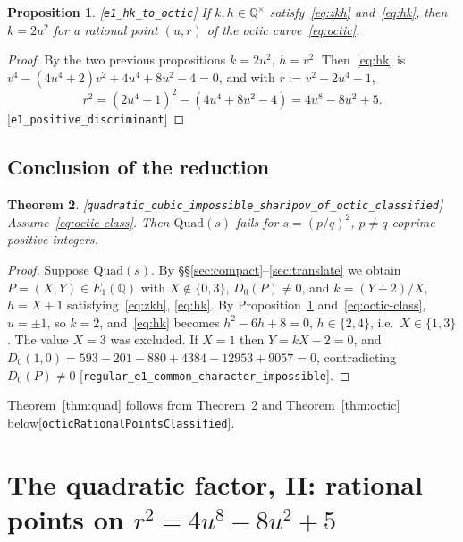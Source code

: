 \documentclass[10pt]{article}
\newtheorem{theorem}{Theorem}[section]
\newtheorem{proposition}[theorem]{Proposition}
\theoremstyle{definition}
\theoremstyle{remark}
\newcommand{\Q}{\mathbb{Q}}
\newcommand{\leanref}[1]{{\scriptsize\textup{[\texttt{#1}]}}\allowbreak}
\begin{document}
\begin{proposition}\label{prop:to-octic}
\leanref{e1\_\allowbreak hk\_\allowbreak to\_\allowbreak octic}
If $k,h\in\Q^\times$ satisfy~\eqref{eq:zkh} and~\eqref{eq:hk}, then
$k=2u^2$ for a rational point $(u,r)$ of the octic curve~\eqref{eq:octic}.
\end{proposition}
\begin{proof}
By the two previous propositions $k=2u^2$, $h=v^2$.  Then~\eqref{eq:hk} is
$v^4-(4u^4+2)v^2+4u^4+8u^2-4=0$, and with $r:=v^2-2u^4-1$,
\[
 r^2=(2u^4+1)^2-(4u^4+8u^2-4)=4u^8-8u^2+5 .
\]
\leanref{e1\_\allowbreak positive\_\allowbreak discriminant}
\end{proof}

\subsection{Conclusion of the reduction}

\begin{theorem}\label{thm:quad-conditional}
\leanref{quadratic\_\allowbreak cubic\_\allowbreak impossible\_\allowbreak sharipov\_\allowbreak of\_\allowbreak octic\_\allowbreak classified}
Assume~\eqref{eq:octic-class}.  Then $\mathrm{Quad}(s)$ fails for
$s=(p/q)^2$, $p\ne q$ coprime positive integers.
\end{theorem}
\begin{proof}
Suppose $\mathrm{Quad}(s)$.  By \S\S\ref{sec:compact}--\ref{sec:translate} we
obtain $P=(X,Y)\in E_1(\Q)$ with $X\notin\{0,3\}$, $D_0(P)\ne0$, and
$k=(Y+2)/X$, $h=X+1$ satisfying~\eqref{eq:zkh}, \eqref{eq:hk}.  By
Proposition~\ref{prop:to-octic} and~\eqref{eq:octic-class}, $u=\pm1$, so
$k=2$, and~\eqref{eq:hk} becomes $h^2-6h+8=0$, $h\in\{2,4\}$, i.e.\ $X\in\{1,3\}$.
The value $X=3$ was excluded.  If $X=1$ then $Y=kX-2=0$, and
$D_0(1,0)=593-201-880+4384-12953+9057=0$, contradicting $D_0(P)\ne0$
\leanref{regular\_\allowbreak e1\_\allowbreak common\_\allowbreak character\_\allowbreak impossible}.
\end{proof}

Theorem~\ref{thm:quad} follows from Theorem~\ref{thm:quad-conditional} and
Theorem~\ref{thm:octic} below\leanref{octic\allowbreak Rational\allowbreak Points\allowbreak Classified}.
\section{The quadratic factor, II: rational points on \texorpdfstring{$r^2=4u^8-8u^2+5$}{r²=4u⁸−8u²+5}}\label{sec:quad2}
\end{document}
